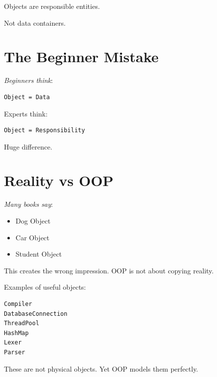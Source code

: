 \documentclass[11pt,a4paper]{book}
\begin{document}
\begin{rosettarule}

Objects are responsible entities.

Not data containers.

\end{rosettarule}
\newpage

\section{The Beginner Mistake}

\emph{Beginners think}:

\begin{verbatim}
Object = Data
\end{verbatim}

Experts think:

\begin{verbatim}
Object = Responsibility
\end{verbatim}

Huge difference.


\section{Reality vs OOP}

\begin{trap}

\emph{Many books say}:
\begin{itemize}
\item [\textcolor{RosettaDeepGreen}{::}]Dog Object
\item [\textcolor{RosettaDeepGreen}{::}]Car Object
\item [\textcolor{RosettaDeepGreen}{::}]Student Object
\end{itemize}
This creates the wrong impression.
OOP is \textcolor{RosettaOrange}{not about copying} reality.

\end{trap}

Examples of useful objects:

\begin{verbatim}
Compiler
DatabaseConnection
ThreadPool
HashMap
Lexer
Parser
\end{verbatim}

These are not physical objects.
Yet OOP models them perfectly.
\end{document}
